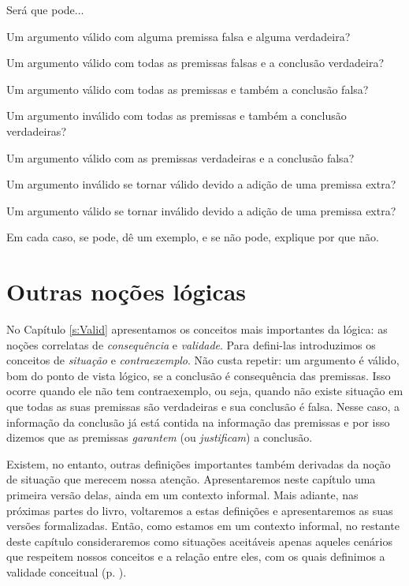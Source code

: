 \problempart
\label{pr.EnglishCombinations}
Será que pode...
	\begin{earg}
		\item Um argumento válido com alguma premissa falsa e alguma verdadeira?
		\item Um argumento válido com todas as premissas falsas e a conclusão verdadeira?
		\item Um argumento válido com todas as premissas e também a conclusão falsa?
		\item Um argumento inválido com todas as premissas e também a conclusão verdadeiras?
		\item Um argumento válido com as premissas verdadeiras e a conclusão falsa?
		\item Um argumento inválido se tornar válido devido a adição de uma premissa extra?
		\item Um argumento válido se tornar inválido devido a adição de uma premissa extra?
	\end{earg}
Em cada caso, se pode, dê um exemplo, e se não pode, explique por que não.


\chapter{Outras noções lógicas}\label{s:BasicNotions}

No Capítulo \ref{s:Valid} apresentamos os conceitos mais importantes da lógica:
as noções correlatas de \textit{consequência} e  \textit{validade}.
Para defini-las introduzimos os conceitos de \textit{situação} e \textit{contraexemplo}. 
Não custa repetir:
um argumento é válido, bom do ponto de vista lógico, se a conclusão é consequência das premissas.
Isso ocorre  quando ele não tem contraexemplo, ou seja, quando não existe situação em que todas as suas premissas são verdadeiras e sua conclusão é falsa.
Nesse caso, a informação da conclusão já está contida na informação das premissas e por isso dizemos que as premissas \textit{garantem} (ou \textit{justificam}) a conclusão.

Existem, no entanto, outras definições importantes também derivadas da noção de situação que merecem nossa atenção.
Apresentaremos neste capítulo uma primeira versão delas, ainda em um contexto informal. Mais adiante, nas próximas partes do livro, voltaremos a estas definições e apresentaremos as suas versões formalizadas.
Então, como estamos em um contexto informal, no restante deste capítulo consideraremos como situações aceitáveis apenas aqueles cenários que respeitem nossos conceitos e a relação entre eles, com os quais definimos a validade conceitual (p. \pageref{nomoval}).

